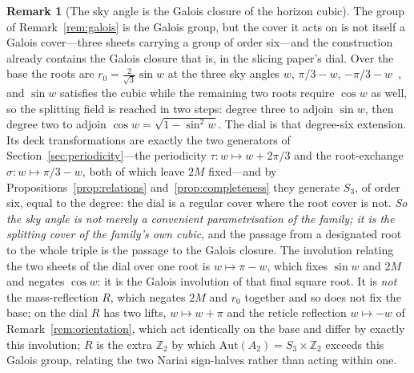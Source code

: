 \documentclass[11pt,a4paper]{article}
\theoremstyle{definition}
\newtheorem{remark}[theorem]{Remark}
\begin{document}
\begin{remark}[The sky angle is the Galois closure of the horizon cubic]\label{rem:galois-closure}
The group of Remark~\ref{rem:galois} is the Galois group, but the cover it acts on is not itself a Galois
cover---three sheets carrying a group of order six---and the construction already contains the Galois closure
that is, in the slicing paper's dial. Over the base the roots are
$r_{0}=\tfrac{2}{\sqrt3}\sin w$ at the three sky angles $w$, $\pi/3-w$, $-\pi/3-w$~\cite{JanzenSlicing}, and
$\sin w$ satisfies the cubic while the remaining two roots require $\cos w$ as well, so the splitting field is
reached in two steps: degree three to adjoin $\sin w$, then degree two to adjoin
$\cos w=\sqrt{1-\sin^{2}w}$. The dial is that degree-six extension.
Its deck transformations are exactly the two generators of Section~\ref{sec:periodicity}---the periodicity
$\tau:w\mapsto w+2\pi/3$ and the root-exchange $\sigma:w\mapsto\pi/3-w$, both of which leave $2M$
fixed---and by Propositions~\ref{prop:relations} and~\ref{prop:completeness} they generate $S_{3}$, of order six, equal to the degree: the dial is
a regular cover where the root cover is not. \emph{So the sky angle is not merely a convenient parametrisation
of the family; it is the splitting cover of the family's own cubic}, and the passage from a designated root to
the whole triple is the passage to the Galois closure. The involution relating the two sheets of the dial over
one root is $w\mapsto\pi-w$, which fixes $\sin w$ and $2M$ and negates $\cos w$: it is the Galois involution of
that final square root. It is \emph{not} the mass-reflection $R$, which negates $2M$ and $r_{0}$ together and so does not fix
the base; on the dial $R$ has two lifts, $w\mapsto w+\pi$ and the reticle reflection $w\mapsto-w$ of
Remark~\ref{rem:orientation}, which act identically on the base and differ by exactly this involution; $R$ is the extra $\mathbb{Z}_{2}$ by which
$\mathrm{Aut}(A_{2})=S_{3}\times\mathbb{Z}_{2}$ exceeds this Galois group, relating the two Nariai sign-halves
rather than acting within one.
\end{remark}
\end{document}

